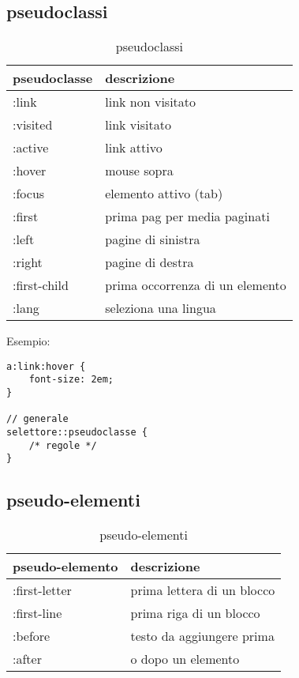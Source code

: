 \documentclass[12pt]{article}
\begin{document}
\subsection{pseudoclassi}
\begin{table}[H]
	\centering
	\begin{tabular}{|l|l|}
		\hline
		pseudoclasse & descrizione                     \\
		\hline
		:link        & link non visitato               \\
		:visited     & link visitato                   \\
		:active      & link attivo                     \\
		:hover       & mouse sopra                     \\
		:focus       & elemento attivo (tab)           \\
		:first       & prima pag per media paginati    \\
		:left        & pagine di sinistra              \\
		:right       & pagine di destra                \\
		:first-child & prima occorrenza di un elemento \\
		:lang        & seleziona una lingua            \\
		\hline
	\end{tabular}
	\caption{pseudoclassi}
\end{table}

Esempio:
\begin{lstlisting}
a:link:hover {
	font-size: 2em;
}

// generale
selettore::pseudoclasse {
	/* regole */
}
\end{lstlisting}

\subsection{pseudo-elementi}
\begin{table}[H]
	\centering
	\begin{tabular}{|l|l|}
		\hline
		pseudo-elemento & descrizione                \\
		\hline
		:first-letter   & prima lettera di un blocco \\
		:first-line     & prima riga di un blocco    \\
		:before         & testo da aggiungere prima  \\
		:after          & o dopo un elemento         \\
		\hline
	\end{tabular}
	\caption{pseudo-elementi}
\end{table}
\end{document}
